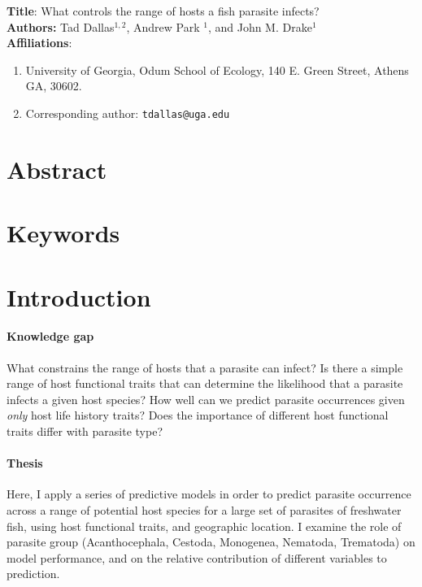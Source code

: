 \documentclass[12pt]{article}
\begin{document}
\setcounter{page}{1}

\textbf{Title}: What controls the range of hosts a fish parasite infects? \\
\vspace{0.5cm}
\textbf{Authors:} Tad Dallas$^{1,2}$, Andrew Park $^{1}$, and John M. Drake$^{1}$ \\
\vspace{0.5cm}
\textbf{Affiliations}: 
\begin{enumerate}
  \item University of Georgia, Odum School of Ecology, 140 E. Green Street, Athens GA, 30602. 
  \item Corresponding author: \texttt{tdallas@uga.edu}
\end{enumerate}


\linenumbers
\doublespacing


\section{Abstract}


\section{Keywords}



\section{Introduction}
 


 \paragraph{Knowledge gap}

What constrains the range of hosts that a parasite can infect? Is there a simple range of host functional traits that can determine the likelihood that a parasite infects a given host species? How well can we predict parasite occurrences given \textit{only} host life history traits? Does the importance of different host functional traits differ with parasite type?
 
 \paragraph{Thesis}
 
 Here, I apply a series of predictive models in order to predict parasite occurrence across a range of potential host species for a large set of parasites of freshwater fish, using host functional traits, and geographic location. I examine the role of parasite group (Acanthocephala, Cestoda, Monogenea, Nematoda, Trematoda) on model performance, and on the relative contribution of different variables to prediction. 
 
\end{document}
